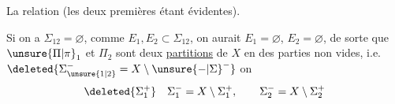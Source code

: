  La  relation (les deux premières étant évidentes).

Si on a $\Sigma_{12}=\varnothing$, comme $E_1,E_2\subset\Sigma_{12}$,
on aurait $E_1=\varnothing$, $E_2=\varnothing$, de sorte que $\unsure{\Pi|\pi}_1$ et $\Pi_2$ sont deux \uline{partitions} de $X$ en des parties non vides, i.e.
$\deleted{\Sigma_{\unsure{1|2}}^- = X\setminus\unsure{-|\Sigma}^{-}}$ on 
\[
\deleted{\Sigma_1^+}\quad \Sigma_1^-=X\setminus\Sigma_1^+,\qquad \Sigma_2^-=X\setminus\Sigma_2^+
\]
\endgroup

